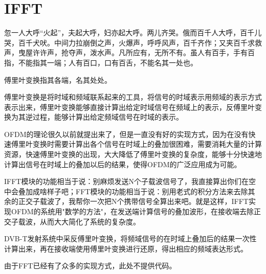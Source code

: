 	\section{IFFT}
		\par 忽一人大呼“火起”，夫起大呼，妇亦起大呼。两儿齐哭。俄而百千人大呼，百千儿哭，百千犬吠。中间力拉崩倒之声，火爆声，呼呼风声，百千齐作；又夹百千求救声，曳屋许许声，抢夺声，泼水声。凡所应有，无所不有。虽人有百手，手有百指，不能指其一端；人有百口，口有百舌，不能名其一处也。
		\par 傅里叶变换指其各端，名其处处。
		\par 傅里叶变换是将时域和频域联系起来的工具，将信号的时域表示用频域的表示方式表示出来，傅里叶变换能够直接计算出给定时域信号在频域上的表示，反傅里叶变换为其逆过程，能够计算出给定频域信号在时域的表示。
		\par OFDM的理论很久以前就提出来了，但是一直没有好的实现方式，因为在没有快速傅里叶变换时需要计算出各个信号在时域上的叠加很困难，需要消耗大量的计算资源，快速傅里叶变换的出现，大大降低了傅里叶变换的复杂度，能够十分快速地计算出信号在时域上的叠加以后的结果，使得OFDM的广泛应用成为可能。
		\par IFFT模块的功能相当于说：别麻烦发送N个子载波信号了，我直接算出你们在空中会叠加成啥样子吧；FFT模块的功能相当于说：别用老式的积分方法来去除其余的正交子载波了，我帮你一次把N个携带信号全算出来吧。就是这样，IFFT实现OFDM的系统用"数学的方法"，在发送端计算信号的叠加波形，在接收端去除正交子载波，从而大大简化了系统的复杂度。
		\par DVB-T发射系统中采反傅里叶变换，将频域信号的在时域上叠加后的结果一次性计算出来，再在接收端使用傅里叶变换进行还原，得出相应的频域表达形式。
		\par 由于FFT已经有了众多的实现方式，此处不提供代码。
